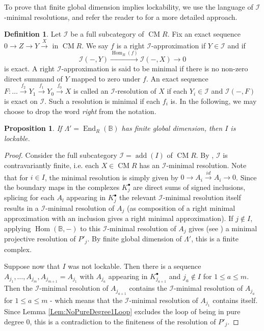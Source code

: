 \documentclass[reqno, 12pt]{amsart}
\newtheorem{proposition}[theorem]{Proposition}
\theoremstyle{definition}
\newtheorem{definition}[theorem]{Definition}
\numberwithin{equation}{section}
\newcommand{\newterm}{\textsf}
\newcommand{\Hom}{\operatorname{Hom}}
\newcommand{\End}{\operatorname{End}}
\begin{document}
 To prove that finite global dimension implies lockability, we use the language of $\mathcal{I}$-minimal resolutions, and refer the reader to \cite{DFI16} for a more detailed approach. 
\begin{definition}
    Let $\mathcal{I}$ be a full subcategory of $\operatorname{CM}R$. Fix an exact sequence $0\rightarrow Z\rightarrow Y\xrightarrow X$ in $\operatorname{CM}R$. We say $f$ is a \newterm{right $\mathcal{I}$-approximation} if $Y\in \mathcal{I}$ and if \[
    \mathcal{I}(-,Y)\xrightarrow{\Hom_R(f)} \mathcal{I}(-,X)\rightarrow 0
    \] 
    is exact. A right $\mathcal{I}$-approximation is said to be \newterm{minimal} if there is no non-zero direct summand of $Y$ mapped to zero under $f$. An exact sequence $F:\dots\xrightarrow{f_2}Y_1\xrightarrow{f_1}Y_0\xrightarrow{f_0} X$ is called an $\mathcal{I}$-resolution of $X$ if each $Y_i\in \mathcal{I}$ and $\mathcal{I}(-,F)$ is exact on $\mathcal{I}$. Such a resolution is \newterm{minimal} if each $f_i$ is. In the following, we may choose to drop the word \textit{right} from the notation.
\end{definition}
 

\begin{proposition}
    \label{Prop:fingldim implies lockable}
    If $\Lambda'=\End_R(\mathbb{B})$ has finite global dimension, then $I$ is lockable.
\end{proposition}
\begin{proof}
    Consider the full subcategory $\mathcal{I}=\operatorname{add}(I)$ of $\operatorname{CM}R$. By \cite[Lemma 2.7]{DFI16}, $\mathcal{I}$ is contravariantly finite, i.e. each $X\in \operatorname{CM}R$ has an $\mathcal{I}$-minimal resolution. Note that for $i\in I$, the minimal resolution is simply given by $0\rightarrow A_i\xrightarrow{id}A_i\rightarrow 0$. Since the boundary maps in the complexes $K_j^\bullet$ are direct sums of signed inclusions, splicing for each $A_l$ appearing in $K_j^\bullet$ the relevant $\mathcal{I}$-minimal resolution itself results in a $\mathcal{I}$-minimal resolution of $A_j$ (as composition of a right minimal approximation with an inclusion gives a right minimal approximation). If $j\not\in I$, applying $\Hom(\mathbb{B},-)$ to this $\mathcal{I}$-minimal resolution of $A_j$ gives (see \cite[Lemma 2.10]{DFI16})  a minimal projective resolution of $P'_j$. By finite global dimension of $\Lambda'$, this is a finite complex.
    
   \noindent Suppose now that $I$ was not lockable. Then there is a sequence $A_{j_1},\dots, A_{j_m}, A_{j_{m+1}}=A_{j_1}$ with $A_{j_a}$ appearing in $K^\bullet_{j_{a+1}}$ and $j_a\not\in I$ for $1\le a\le m$. Then the $\mathcal{I}$-minimal resolution of $A_{j_{a+1}}$ contains the $\mathcal{I}$-minimal resolution of $A_{j_{a}}$ for $1\le a\le m$ - which means that the $\mathcal{I}$-minimal resolution of $A_{j_1}$ contains itself. Since Lemma \ref{Lem:NoPureDegree1Loop} excludes the loop of being in pure degree 0, this is a contradiction to the finiteness of the resolution of $P'_j$.

\end{proof} 
\end{document}
